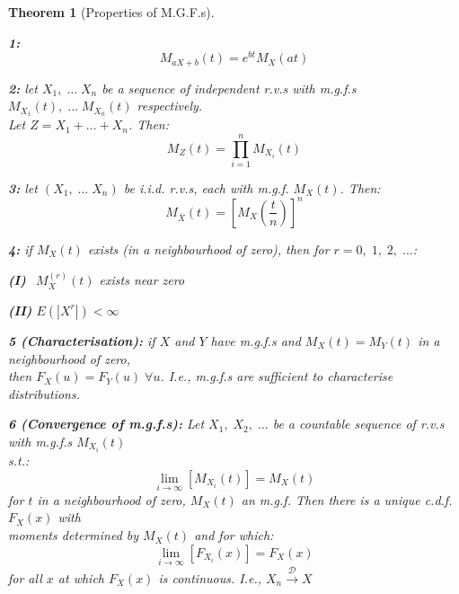 \documentclass[12pt,a4paper]{article}
\newtheorem{thm}{Theorem}[subsection]
\begin{document}
\begin{thm}[Properties of M.G.F.s]\label{mgf properties}\vspace{1cm}

\textbf{1: }
$$M_{aX+b}(t) = e^{bt}M_X(at)$$\par\vspace{1cm}

\textbf{2: } let $X_1,\;\hdots\;X_n$ be a sequence of independent r.v.s with m.g.f.s $M_{X_1}(t),\;\hdots\;M_{X_n}(t)$ respectively.\\ \indent\indent Let $Z= X_1 + \hdots + X_n$. Then:
$$M_Z(t) = \prod_{i=1}^n M_{X_i}(t)$$\par\vspace{1cm}

\textbf{3: } let $(X_1,\;\hdots\;X_n)$ be i.i.d. r.v.s, each with m.g.f. $M_X(t)$. Then:
$$M_{\bar{X}}(t) = \left[M_X\left(\frac{t}{n}\right)\right]^n$$\par\vspace{1cm}

\textbf{4: } if $M_X(t)$ exists (in a neighbourhood of zero), then for $r=0,\;1,\;2,\;\hdots$:\par
\indent\indent \textbf{(I) }  $\;\,M_X^{(r)}(t)$ exists near zero\par
\indent\indent \textbf{(II) }  $E\left(\left|X^r\right|\right) < \infty$\par

\textbf{5 (Characterisation): } if $X$ and $Y$ have m.g.f.s and $M_X(t) = M_Y(t)$ in a neighbourhood of zero,\\ \indent\indent then $F_X(u) = F_Y(u)\;\forall u$. I.e., m.g.f.s are sufficient to characterise distributions.\par\vspace{1cm}

\textbf{6 (Convergence of m.g.f.s): } Let $X_1,\;X_2,\;\hdots$ be a countable sequence of r.v.s with m.g.f.s $M_{X_i}(t)$\\ \indent\indent s.t.:
$$\lim_{i\to\infty}\left[M_{X_i}(t)\right] = M_X(t)$$
\indent\indent for $t$ in a neighbourhood of zero, $M_X(t)$ an m.g.f. Then there is a unique c.d.f. $F_X(x)$ with\\ \indent\indent moments determined by $M_X(t)$ and for which:
$$\lim_{i\to\infty}\left[F_{X_i}(x)\right] = F_X(x)$$
\indent\indent for all $x$ at which $F_X(x)$ is continuous. I.e., $X_n\xrightarrow{\mathscr{D}}X$

\end{thm}
\end{document}
